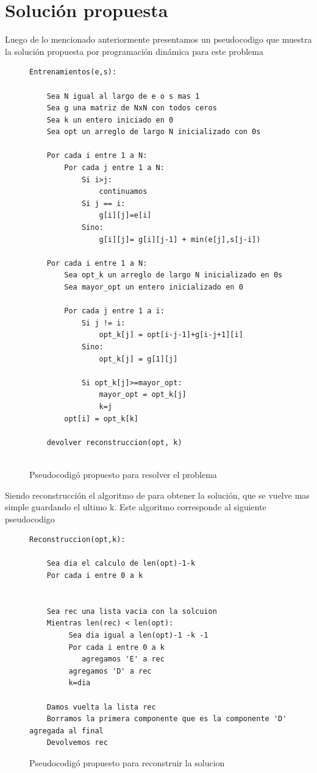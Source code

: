 \section{Solución propuesta}

Luego de lo mencionado anteriormente presentamos un pseudocodigo que muestra la solución propuesta por programación dinámica para este problema

\begin{figure}[H]
\centering
\begin{lstlisting}[style=fileformat]
Entrenamientos(e,s): 

	Sea N igual al largo de e o s mas 1
	Sea g una matriz de NxN con todos ceros
	Sea k un entero iniciado en 0
	Sea opt un arreglo de largo N inicializado con 0s
	
	Por cada i entre 1 a N:
		Por cada j entre 1 a N:
			Si i>j: 
				continuamos 
			Si j == i:
				g[i][j]=e[i]
			Sino:
				g[i][j]= g[i][j-1] + min(e[j],s[j-i])
	
	Por cada i entre 1 a N:
		Sea opt_k un arreglo de largo N inicializado en 0s
		Sea mayor_opt un entero inicializado en 0
			
		Por cada j entre 1 a i:
			Si j != i:
				opt_k[j] = opt[i-j-1]+g[i-j+1][i]
			Sino:
				opt_k[j] = g[1][j]
			
			Si opt_k[j]>=mayor_opt:
				mayor_opt = opt_k[j]
				k=j
		opt[i] = opt_k[k]

	devolver reconstruccion(opt, k)	
	
\end{lstlisting}
\label{cod:ordenado}
\caption{Pseudocodigó propuesto para resolver el problema}
\end{figure}


Siendo reconstrucción el algoritmo de para obtener la solución, que se vuelve mas simple guardando el ultimo k. Este algoritmo corresponde al siguiente pseudocodigo

\begin{figure}[H]
\centering
\begin{lstlisting}[style=fileformat]
Reconstruccion(opt,k): 

	Sea dia el calculo de len(opt)-1-k
	Por cada i entre 0 a k
		

    Sea rec una lista vacia con la solcuion
    Mientras len(rec) < len(opt):
         Sea dia igual a len(opt)-1 -k -1
         Por cada i entre 0 a k
            agregamos 'E' a rec
         agregamos 'D' a rec
         k=dia

    Damos vuelta la lista rec
    Borramos la primera componente que es la componente 'D' agregada al final
	Devolvemos rec

\end{lstlisting}
\label{cod:ordenado}
\caption{Pseudocodigó propuesto para reconstruir la solucion}
\end{figure}